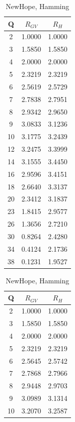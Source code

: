 \begin{table}[h]
	\begin{minipage}{0.48\textwidth}
		\centering
		\begin{tabular}{|c|c|c|}
			\hline Q & $R_{GV}$ & $R_H$ \\ \hline
			2 & 1.0000 & 1.0000 \\ \hline
			3 & 1.5850 & 1.5850 \\ \hline
			4 & 2.0000 & 2.0000 \\ \hline
			5 & 2.3219 & 2.3219 \\ \hline
			6 & 2.5619 & 2.5729 \\ \hline
			7 & 2.7838 & 2.7951 \\ \hline
			8 & 2.9342 & 2.9650 \\ \hline
			9 & 3.0833 & 3.1236 \\ \hline
			10 & 3.1775 & 3.2439 \\ \hline
			12 & 3.2475 & 3.3999 \\ \hline
			14 & 3.1555 & 3.4450 \\ \hline
			16 & 2.9596 & 3.4151 \\ \hline
			18 & 2.6640 & 3.3137 \\ \hline
			20 & 2.3412 & 3.1837 \\ \hline
			23 & 1.8415 & 2.9577 \\ \hline
			26 & 1.3656 & 2.7210 \\ \hline
			30 & 0.8264 & 2.4280 \\ \hline
			34 & 0.4124 & 2.1736 \\ \hline
			38 & 0.1231 & 1.9527 \\ \hline
		\end{tabular}
		\caption*{NewHope, Hamming}
	\end{minipage}
	\begin{minipage}{0.48\textwidth}
		\centering
		\begin{tabular}{|c|c|c|}
			\hline Q & $R_{GV}$ & $R_H$ \\ \hline
			2 & 1.0000 & 1.0000 \\ \hline
			3 & 1.5850 & 1.5850 \\ \hline
			4 & 2.0000 & 2.0000 \\ \hline
			5 & 2.3219 & 2.3219 \\ \hline
			6 & 2.5645 & 2.5742 \\ \hline
			7 & 2.7868 & 2.7966 \\ \hline
			8 & 2.9448 & 2.9703 \\ \hline
			9 & 3.0989 & 3.1314 \\ \hline
			10 & 3.2070 & 3.2587 \\ \hline

\end{tabular}
\end{minipage}
\end{table}
